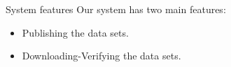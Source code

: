 

\begin{frame}{System features}
    Our system has two main features:
    \begin{itemize}
        \item Publishing the data sets.
        \item Downloading-Verifying the data sets.
    \end{itemize}
\end{frame}


